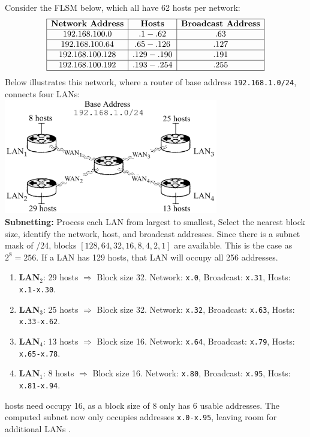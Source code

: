 \newpage 

\begin{Example}


Consider the FLSM below, which all have 62 hosts per network:
\[
\begin{array}{|c|c|c|}
\hline
\textbf{Network Address} & \textbf{Hosts} & \textbf{Broadcast Address} \\ \hline
192.168.100.0 & .1 - .62 & .63 \\ \hline
192.168.100.64 & .65 - .126 & .127 \\ \hline
192.168.100.128 & .129 - .190 & .191 \\ \hline
192.168.100.192 & .193 - .254 & .255 \\ \hline
\end{array}
\]
\noindent
Below illustrates this network, where a router of base address \texttt{192.168.1.0/24},
connects four LANs:\\

\hspace{4em}
\includegraphics[width=0.7\textwidth]{Sections/network/subnetting.png}\\

\noindent
\textbf{Subnetting:} Process each LAN from largest to smallest, Select the nearest block size, identify the network, host, and broadcast addresses.
Since there is a subnet mask of /24, blocks $[128, 64, 32, 16, 8, 4, 2, 1]$ are available. This is the case as 
$2^8 = 256$. If a LAN has 129 hosts, that LAN will occupy all 256 addresses.\\
\begin{enumerate}
    \item \textbf{LAN$_2$}: 29 hosts $\Rightarrow$ Block size 32. Network: \texttt{x.0}, Broadcast: \texttt{x.31}, Hosts: \texttt{x.1-x.30}.
    \item \textbf{LAN$_3$}: 25 hosts $\Rightarrow$ Block size 32. Network: \texttt{x.32}, Broadcast: \texttt{x.63}, Hosts: \texttt{x.33-x.62}.
    \item \textbf{LAN$_4$}: 13 hosts $\Rightarrow$ Block size 16. Network: \texttt{x.64}, Broadcast: \texttt{x.79}, Hosts: \texttt{x.65-x.78}.
    \item \textbf{LAN$_1$}: 8 hosts $\Rightarrow$ Block size 16. Network: \texttt{x.80}, Broadcast: \texttt{x.95}, Hosts: \texttt{x.81-x.94}.
\end{enumerate}

 hosts need occupy 16, as a block size of 8 only has 6 usable addresses. The computed subnet now only occupies addresses 
\texttt{x.0-x.95}, leaving room for additional LANs \cite{eastcharmer_vlsm_subnetting}. 

\end{Example}
    



